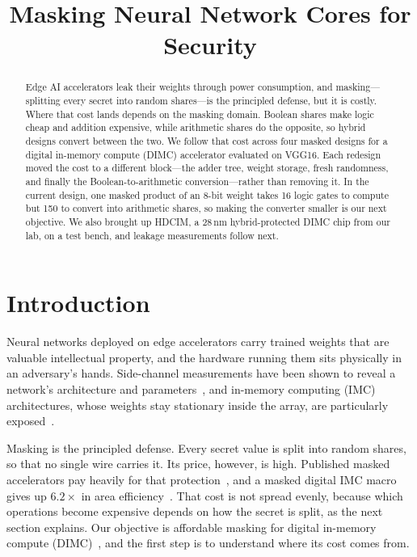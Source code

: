 \documentclass[conference]{IEEEtran}
\begin{document}
\title{Masking Neural Network Cores for Security}

\author{
}

\maketitle

\begin{abstract}
Edge AI accelerators leak their weights through power consumption, and masking---splitting every
secret into random shares---is the principled defense, but it is costly. Where that cost lands depends on the
masking domain. Boolean shares make logic cheap and addition expensive, while arithmetic shares do the opposite,
so hybrid designs convert between the two. We follow that cost across four masked designs for a digital
in-memory compute (DIMC) accelerator evaluated on VGG16. Each redesign moved the cost to a different block---the adder
tree, weight storage, fresh randomness, and finally the Boolean-to-arithmetic conversion---rather than removing
it. In the current design, one masked product of an 8-bit weight takes 16 logic gates to compute but 150 to
convert into arithmetic shares, so making the converter smaller is our next objective. We also brought up
HDCIM, a 28\,nm hybrid-protected DIMC chip from our lab, on a test bench, and leakage measurements
follow next.
\end{abstract}

\section{Introduction}
Neural networks deployed on edge accelerators carry trained weights that are valuable intellectual property,
and the hardware running them sits physically in an adversary's hands. Side-channel measurements have been shown
to reveal a network's architecture and parameters~\cite{batina2019csinn}, and in-memory computing (IMC)
architectures, whose weights stay stationary inside the array, are particularly exposed~\cite{wang2024imc}.

Masking is the principled defense. Every secret value is split into random shares, so that no single wire
carries it. Its price, however, is high. Published masked accelerators pay heavily for that protection~\cite{maji2023ti},
and a masked digital IMC macro gives up $6.2\times$ in area efficiency~\cite{ashok2025imc}. That cost is not spread evenly, because which operations
become expensive depends on how the secret is split, as the next section explains. Our objective is affordable masking
for digital in-memory compute (DIMC)~\cite{chih2021dimc}, and the first step is to understand where its cost comes from.
\end{document}
